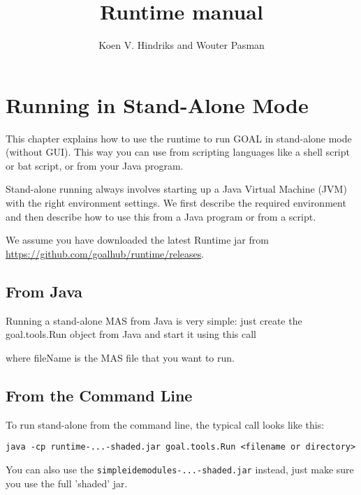 \documentclass{book}
\begin{document}
\title{Runtime manual}
\author{Koen V. Hindriks and Wouter Pasman}
\maketitle

%
%
%
\setcounter{tocdepth}{3}




%
%
%
\chapter{Running in Stand-Alone Mode}\label{standalone}
%
This chapter explains how to use the \GOAL runtime to run GOAL in stand-alone mode (without GUI).
This way you can use {\GOAL} from scripting
languages like a shell script or bat script, or from your Java program.

Stand-alone running always involves starting up a Java Virtual Machine (JVM)
with the right environment settings. We first describe the required environment
and then describe how to use this from a Java program or from a script.

We assume you have downloaded the latest Runtime jar from \url{https://github.com/goalhub/runtime/releases}.  


%
%
%
\section{From Java}
%
Running a stand-alone MAS from Java is very simple: just create the
goal.tools.Run object from Java and start it using this call 


where fileName is the MAS file that you want to run.


%
%
%
\section{From the Command Line}
%
To run \GOAL stand-alone from the command line, the typical call looks like this:

\begin{verbatim}
java -cp runtime-...-shaded.jar goal.tools.Run <filename or directory>
\end{verbatim}

You can also use the \verb|simpleidemodules-...-shaded.jar| instead, just make sure you use the full 'shaded' jar.
\end{document}
